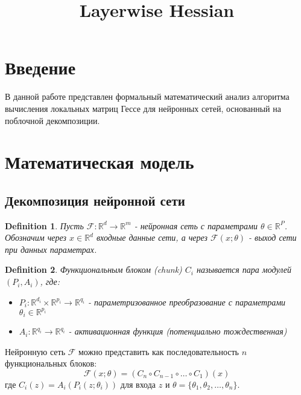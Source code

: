\documentclass[12pt]{article}
\title{Layerwise Hessian}
\author{}
\date{}
\newtheorem{definition}{Definition}
\begin{document}
\maketitle

\section{Введение}
В данной работе представлен формальный математический анализ алгоритма вычисления локальных матриц Гессе для нейронных сетей, основанный на поблочной декомпозиции.

\section{Математическая модель}

\subsection{Декомпозиция нейронной сети}

\begin{definition}
Пусть $\mathcal{F}: \mathbb{R}^d \rightarrow \mathbb{R}^m$ - нейронная сеть с параметрами $\theta \in \mathbb{R}^P$. Обозначим через $x \in \mathbb{R}^d$ входные данные сети, а через $\mathcal{F}(x; \theta)$ - выход сети при данных параметрах.
\end{definition}

\begin{definition}
Функциональным блоком (chunk) $C_i$ называется пара модулей $(P_i, A_i)$, где:
\begin{itemize}
    \item $P_i: \mathbb{R}^{d_i} \times \mathbb{R}^{p_i} \rightarrow \mathbb{R}^{q_i}$ - параметризованное преобразование с параметрами $\theta_i \in \mathbb{R}^{p_i}$
    \item $A_i: \mathbb{R}^{q_i} \rightarrow \mathbb{R}^{q_i}$ - активационная функция (потенциально тождественная)
\end{itemize}
\end{definition}

Нейронную сеть $\mathcal{F}$ можно представить как последовательность $n$ функциональных блоков:
\begin{equation}
\mathcal{F}(x; \theta) = (C_n \circ C_{n-1} \circ \ldots \circ C_1)(x)
\end{equation}
где $C_i(z) = A_i(P_i(z; \theta_i))$ для входа $z$ и $\theta = \{\theta_1, \theta_2, \ldots, \theta_n\}$.
\end{document}
